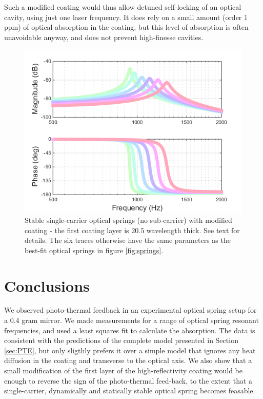 Such a modified coating would thus allow detuned self-locking  of an optical cavity, using just one laser frequency. It does rely on a small amount (order 1 ppm) of optical absorption in the coating, but this level of absorption is often unavoidable anyway, and does not prevent high-finesse cavities. 
\begin{figure}[thb]
\centering
\includegraphics[width=.7\paperwidth]{figures/photothermal/singleCarrierSprings}
\caption{Stable single-carrier optical springs (no sub-carrier) with modified coating - the first coating layer is $20.5$ wavelength thick. See text for details. The six traces otherwise have the same parameters as the best-fit optical springs in figure \ref{fig:springs}. }
\label{fig:SCsprings}
\end{figure}








\section{Conclusions}
We observed photo-thermal feedback in an experimental optical spring setup for a 0.4 gram mirror. We made measurements for a range of optical spring resonant frequencies, and used a least squares fit to calculate the absorption. The data is consistent with the predictions of the complete model presented in Section \ref{sec:PTE}, but only sligthly prefers it over a simple model that ignores any heat diffusion in the coating and transverse to the optical axis. We also show that a small modification of the first layer of the high-reflectivity coating would be enough to reverse the sign of the photo-thermal feed-back, to the extent that a single-carrier, dynamically and statically stable optical spring becomes feasable.

